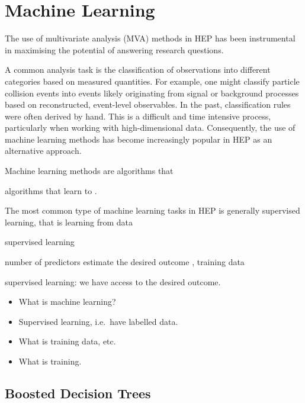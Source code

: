 \section{Machine Learning}%
\label{sec:machine_learning}

The use of multivariate analysis (MVA) methods in HEP has been instrumental in
maximising the potential of answering research questions.


A common analysis task is the classification of observations into different
categories based on measured quantities. For example, one might classify
particle collision events into events likely originating from signal or
background processes based on reconstructed, event-level observables. In the
past, classification rules were often derived by hand. This is a difficult and
time intensive process, particularly when working with high-dimensional
data. Consequently, the use of machine learning methods has become increasingly
popular in HEP as an alternative approach.

Machine learning methods are algorithms that

algorithms that learn to .


The most common type of machine learning tasks in HEP is generally supervised
learning, that is learning from data


supervised learning

number of predictors estimate the desired outcome , training data


supervised learning: we have access to the desired outcome.



\begin{itemize}

\item What is machine learning?

\item Supervised learning, i.e.\ have labelled data.

\item What is training data, etc.

\item What is training.

\end{itemize}


\subsection{Boosted Decision Trees}

